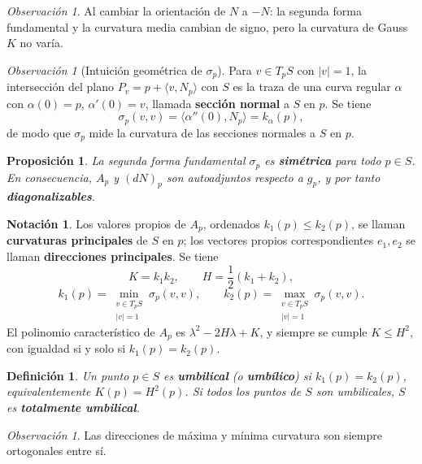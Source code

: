 \documentclass[11pt]{article}
\theoremstyle{plain}
\newtheorem{definicion}[teorema]{Definición}
\newtheorem{proposicion}[teorema]{Proposición}
\theoremstyle{definition}
\newtheorem{notacion}[teorema]{Notación}
\theoremstyle{remark}
\newtheorem{observacion}[teorema]{Observación}
\begin{document}
\begin{observacion}
Al cambiar la orientación de $N$ a $-N$: la segunda forma fundamental y la curvatura media cambian de signo, pero la curvatura de Gauss $K$ no varía.
\end{observacion}

\begin{observacion}[Intuición geométrica de $\sigma_p$]
Para $v\in T_pS$ con $|v|=1$, la intersección del plano $P_v = p + \langle v, N_p\rangle$ con $S$ es la traza de una curva regular $\alpha$ con $\alpha(0)=p$, $\alpha'(0)=v$, llamada \textbf{sección normal} a $S$ en $p$. Se tiene
\[
\sigma_p(v,v) = \langle \alpha''(0), N_p\rangle = k_\alpha(p),
\]
de modo que $\sigma_p$ mide la curvatura de las secciones normales a $S$ en $p$.
\end{observacion}

\begin{proposicion}
La segunda forma fundamental $\sigma_p$ es \textbf{simétrica} para todo $p\in S$. En consecuencia, $A_p$ y $(dN)_p$ son autoadjuntos respecto a $g_p$, y por tanto \textbf{diagonalizables}.
\end{proposicion}

\begin{notacion}
Los valores propios de $A_p$, ordenados $k_1(p)\leq k_2(p)$, se llaman \textbf{curvaturas principales} de $S$ en $p$; los vectores propios correspondientes $e_1, e_2$ se llaman \textbf{direcciones principales}. Se tiene
\[
K = k_1 k_2, \qquad H = \frac{1}{2}(k_1+k_2),
\]
\[
k_1(p) = \min_{\substack{v\in T_pS\\|v|=1}}\sigma_p(v,v), \qquad k_2(p) = \max_{\substack{v\in T_pS\\|v|=1}}\sigma_p(v,v).
\]
El polinomio característico de $A_p$ es $\lambda^2 - 2H\lambda + K$, y siempre se cumple $K\leq H^2$, con igualdad si y solo si $k_1(p)=k_2(p)$.
\end{notacion}

\begin{definicion}
Un punto $p\in S$ es \textbf{umbilical} (o \textbf{umbílico}) si $k_1(p)=k_2(p)$, equivalentemente $K(p)=H^2(p)$. Si todos los puntos de $S$ son umbilicales, $S$ es \textbf{totalmente umbilical}.
\end{definicion}

\begin{observacion}
Las direcciones de máxima y mínima curvatura son siempre ortogonales entre sí.
\end{observacion}
\end{document}
